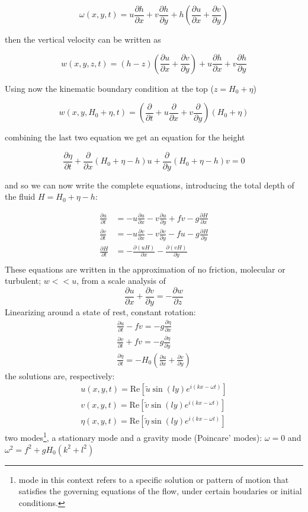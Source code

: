 \[\omega(x,y,t) = u\frac{\partial h}{\partial x} + v\frac{\partial h}{\partial y} + h \left(\frac{\partial u}{\partial x} + \frac{\partial v}{\partial y}\right)\]

then the vertical velocity can be written as

\[w(x,y,z,t) = (h-z)\left(\frac{\partial u}{\partial x} + \frac{\partial v}{\partial y}\right) + u\frac{\partial h}{\partial x} + v\frac{\partial h}{\partial y}\]

Using now the kinematic boundary condition at the top (\(z=H_0+\eta\))

\[w(x,y,H_0+\eta,t) = \left(\frac{\partial }{\partial t} + u\frac{\partial }{\partial x} + v\frac{\partial }{\partial y}\right)(H_0+\eta)\]

combining the last two equation we get an equation for the height

\[\frac{\partial \eta}{\partial t} + \frac{\partial }{\partial x}(H_0+\eta -h)u + \frac{\partial }{\partial y}(H_0+\eta -h)v = 0\]

and so we can now write the complete equations, introducing the total
depth of the fluid \(H=H_0+\eta -h\):

\[\begin{aligned}
\frac{\partial u}{\partial t} &= -u \frac{\partial u}{\partial x} -v \frac{\partial u}{\partial y} + f v -g\frac{\partial H}{\partial x} \\
\frac{\partial v}{\partial t} &= -u \frac{\partial v}{\partial x} -v \frac{\partial v}{\partial y} - f u -g\frac{\partial H}{\partial y}  \\
\frac{\partial H}{\partial t} &= - \frac{\partial (u H)}{\partial x} - \frac{\partial (v H)}{\partial y} \\
\end{aligned}\]
These equations are written in the approximation of no friction, molecular or turbulent; $w<<u$, from a scale analysis of $$\frac{\partial u}{\partial x}+\frac{\partial v}{\partial y}=-\frac{\partial w}{\partial z}$$
Linearizing around a state of rest, constant rotation:
\begin{align*}
    \frac{\partial u}{\partial t}-fv=-g\frac{\partial\eta}{\partial x}\\
    \frac{\partial v}{\partial t}+fv=-g\frac{\partial\eta}{\partial y}\\
    \frac{\partial\eta}{\partial t}=-H_0\left(\frac{\partial u}{\partial x}+\frac{\partial v}{\partial y}\right)
\end{align*}
the solutions are, respectively:
\begin{align*}
    u(x,y,t)=\text{Re}\left[\tilde{u}\sin(ly)e^{i(kx-\omega t)}\right] \\
    v(x,y,t)=\text{Re}\left[\tilde{v}\sin(ly)e^{i(kx-\omega t)}\right]\\
    \eta(x,y,t)=\text{Re}\left[\tilde{\eta}\sin(ly)e^{i(kx-\omega t)}\right]
\end{align*}
two modes\footnote{mode in this context refers to a specific solution or pattern of motion that satisfies the governing equations of the flow, under certain boudaries or initial conditions.}, a stationary mode and a gravity mode (Poincare' modes): $\omega=0$ and $\omega^2=f^2+gH_0(k^2+l^2)$


